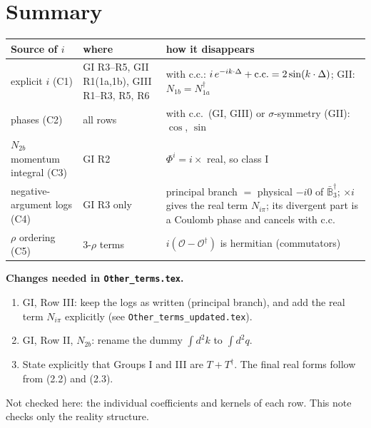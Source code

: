 \documentclass[10pt]{article}
\numberwithin{equation}{section}
\begin{document}
\section{Summary}
\begin{tabular}{p{}p{}p{}}
\toprule
Source of $i$ & where & how it disappears\\\midrule
explicit $i$ (C1) & GI R3--R5, GII R1(1a,1b), GIII R1--R3, R5, R6 & with c.c.: $i\,e^{-ik\cdot\Delta}+{\rm c.c.}=2\sin(k\cdot\Delta)$; GII: $N_{1b}=N_{1a}^\dagger$\\
phases (C2) & all rows & with c.c.\ (GI, GIII) or $\sigma$-symmetry (GII): $\cos$, $\sin$\\
$N_{2b}$ momentum integral (C3) & GI R2 & $\Phi^i=i\times$ real, so class I\\
negative-argument logs (C4) & GI R3 only & principal branch $=$ physical $-i0$ of $\bar{\mathbb B}_3^\dagger$; $\times i$ gives the real term $N_{i\pi}$; its divergent part is a Coulomb phase and cancels with c.c.\\
$\rho$ ordering (C5) & 3-$\rho$ terms & $i(\mathcal O-\mathcal O^\dagger)$ is hermitian (commutators)\\\bottomrule
\end{tabular}

\textbf{Changes needed in \texttt{Other\_terms.tex}.}
\begin{enumerate}
\item GI, Row III: keep the logs as written (principal branch), and add the real term $N_{i\pi}$ explicitly (see \texttt{Other\_terms\_updated.tex}).
\item GI, Row II, $N_{2b}$: rename the dummy $\int d^2k$ to $\int d^2q$.
\item State explicitly that Groups I and III are $T+T^\dagger$. The final real forms follow from (2.2) and (2.3).
\end{enumerate}
Not checked here: the individual coefficients and kernels of each row. This note checks only the reality structure.
\end{document}
